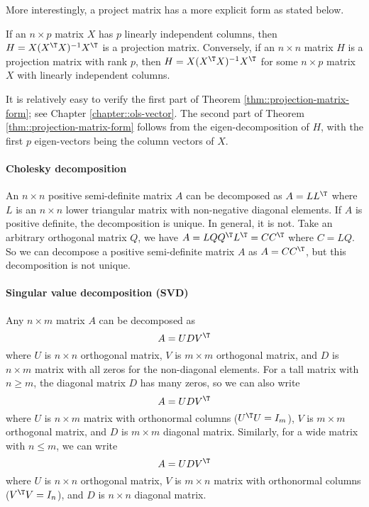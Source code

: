 More interestingly, a project matrix has a more explicit form as stated below. 


\begin{theorem}\label{thm::projection-matrix-form}
If an $n\times p$ matrix $X$ has $p$ linearly independent columns, then $H = X  (X^{\T} X)^{-1} X^{\T}$ is a projection matrix. Conversely, if an $n\times n$ matrix $H$ is a projection matrix with rank $p$, then $H = X  (X^{\T} X)^{-1} X^{\T}$ for some $n\times p$ matrix $X$ with linearly independent columns.
\end{theorem}

It is relatively easy to verify the first part of Theorem \ref{thm::projection-matrix-form}; see Chapter \ref{chapter::ols-vector}. The second part of Theorem \ref{thm::projection-matrix-form} follows from the eigen-decomposition of $H$, with the first $p$ eigen-vectors being the column vectors of $X$. 




\paragraph*{Cholesky decomposition}

An $n\times n$ positive semi-definite matrix $A$ can be decomposed
as $A=LL^{\T}$ where $L$ is an $n\times n$ lower triangular matrix
with non-negative diagonal elements. 
If $A$ is positive definite,  the decomposition is unique. In general, it is not.
Take an arbitrary orthogonal
matrix $Q$, we have $A=LQQ^{\T}L^{\T}=CC^{\T}$ where $C=LQ$. So
we can decompose a positive semi-definite matrix $A$ as $A=CC^{\T}$, but
this decomposition is not unique. 



\paragraph*{Singular value decomposition (SVD)}

Any $n\times m$ matrix $A$ can be decomposed as
$$
A = UDV^{\T}
$$
where $U$ is $n\times n$ orthogonal matrix, $V$ is $m\times m$ orthogonal matrix, and $D$ is $n\times m$ matrix with all zeros for the non-diagonal elements. 
For a tall matrix with $n \geq m$, the diagonal matrix $D$ has many zeros, so we can also write
$$
A = UDV^{\T}
$$
where $U$ is $n\times m$ matrix with orthonormal columns ($U^{\T} U = I_m$), $V$ is $m\times m$ orthogonal matrix, and $D$ is $m\times m$ diagonal matrix. Similarly, for a wide matrix with $n\leq m$, we can write
$$
A = UDV^{\T}
$$
where $U$ is $n\times n$ orthogonal matrix, $V$ is $m\times n$ matrix with orthonormal columns ($V^{\T} V = I_n$), and $D$ is $n\times n$ diagonal matrix. 

